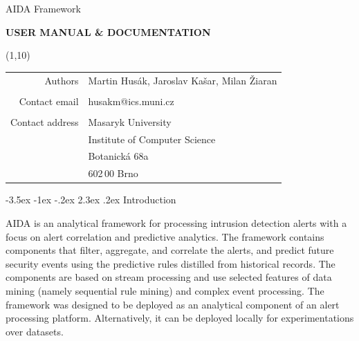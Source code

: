 \documentclass[a4paper]{article} %
\makeatletter
\def\muni{Masaryk University}
\def\uvt{Institute of Computer Science}
\def\street{Botanick\'{a} 68a}
\def\psc{602\,00 Brno}
\def\contactemail{husakm@ics.muni.cz}
\def\projectname{AIDA Framework}
\def\reportauthor{Martin Hus\'{a}k, Jaroslav Ka\v{s}ar, Milan \v{Z}iaran}
\def\reporttitle{User Manual \& Documentation}
\renewcommand\section{\@startsection {section}{1}{\z@}%
                   {-3.5ex \@plus -1ex \@minus -.2ex}%
                   {2.3ex \@plus.2ex}%
                   {\normalfont\sffamily\Large\bfseries\color{projectcolor}}}
\newcommand\BackImage[2][scale=1]{%
\BgThispage
\backgroundsetup{
  contents={\texttt{[image: \#2]}}
  }
}
\makeatother
\begin{document}
\setlength{\parindent}{0cm}

{
\BackImage[width=1.4\textwidth]{fig/titlepage_bg}

\vspace*{5cm}

\color{white}
  \begin{center}
  \vspace{2cm} {\Huge \projectname}

  \vspace{1cm} {\huge\bfseries\MakeUppercase{\reporttitle}}
  \end{center}

  \begin{textblock}{3}(1,10)
         \begin{tabular}{rl }
            Authors & \reportauthor \\
             & \\
            Contact email & \contactemail \\
             & \\
            Contact address & \muni \\
             & \uvt \\
             & \street \\
             & \psc \\
          \end{tabular}
  \end{textblock}
  \cleardoublepage
}

\normalfont



\setcounter{tocdepth}{2}

\tableofcontents

\cleardoublepage

\section{Introduction}

AIDA is an analytical framework for processing intrusion detection alerts with a focus on alert correlation and predictive analytics. The framework contains components that filter, aggregate, and correlate the alerts, and predict future security events using the predictive rules distilled from historical records. The components are based on stream processing and use selected features of data mining (namely sequential rule mining) and complex event processing. The framework was designed to be deployed as an analytical component of an alert processing platform. Alternatively, it can be deployed locally for experimentations over datasets.
\end{document}
